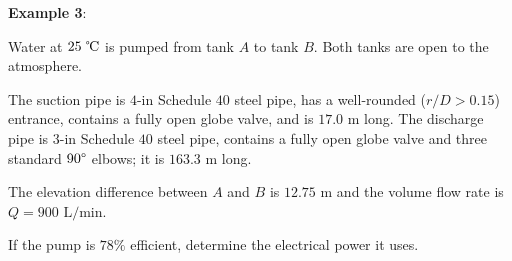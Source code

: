 \documentclass[10pt]{amsart}
\begin{document}


\textbf{Example 3}:

Water at $25\text{ \textcelsius}$ is pumped from tank $A$ to tank $B$.
Both tanks are open to the atmosphere.

The suction pipe is $4\text{-in}$ Schedule $40$ steel pipe, has a well-rounded ($r/D>0.15$) entrance, contains a fully
open globe valve, and is $17.0\text{ m}$ long. The discharge pipe is $3\text{-in}$ Schedule $40$ steel pipe, contains a fully open globe valve and
three standard $90\degree$ elbows; it is $163.3\text{ m}$ long.

The elevation difference between $A$ and $B$ is $12.75\text{ m}$ and the volume flow rate is $Q=900\text{ L/min}$.

If the pump is $78\%$ efficient, determine the electrical power it uses.

\end{document}
